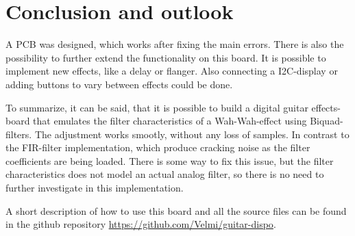 \section{Conclusion and outlook}

A \ac{PCB} was designed, which works after fixing the main errors. There is also the possibility to further
extend the functionality on this board. It is possible to implement new effects, like a delay or flanger.
Also connecting a \ac{I2C}-display or adding buttons to vary between effects could be done.

To summarize, it can be said, that it is possible to build a digital guitar effects-board that emulates
the filter characteristics of a Wah-Wah-effect using Biquad-filters. The adjustment works smootly, without
any loss of samples. In contrast to the \ac{FIR}-filter implementation, which produce cracking noise
as the filter coefficients are being loaded. There is some way to fix this issue, but the filter characteristics
does not model an actual analog filter, so there is no need to further investigate in this implementation.

A short description of how to use this board and all the source files can be found in the github repository
\url{https://github.com/Velmi/guitar-dispo}.
